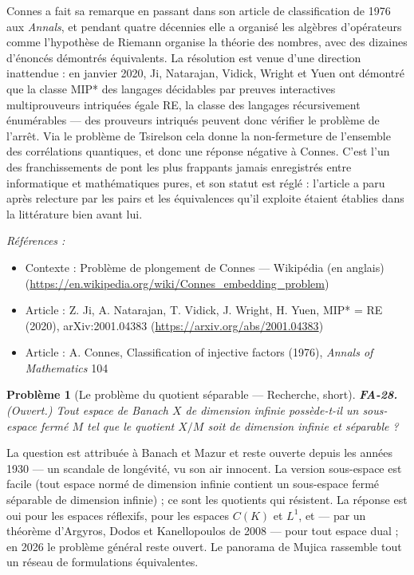 \documentclass[11pt]{article}
\newtheorem{problem}{Problème}
\newenvironment{refs}{\par\small\noindent\emph{Références :}\begin{itemize}\setlength\itemsep{0pt}}{\end{itemize}\normalsize}
\begin{document}
\noindent Connes a fait sa remarque en passant dans son article de classification de 1976 aux
\textit{Annals}, et pendant quatre décennies elle a organisé les algèbres d'opérateurs comme l'hypothèse de
Riemann organise la théorie des nombres, avec des dizaines d'énoncés démontrés équivalents. La résolution
est venue d'une direction inattendue : en janvier 2020, Ji, Natarajan, Vidick, Wright et Yuen ont démontré
que la classe MIP* des langages décidables par preuves interactives multiprouveurs intriquées égale RE, la
classe des langages récursivement énumérables --- des prouveurs intriqués peuvent donc vérifier le problème
de l'arrêt. Via le problème de Tsirelson cela donne la non-fermeture de l'ensemble des corrélations
quantiques, et donc une réponse négative à Connes. C'est l'un des franchissements de pont les plus
frappants jamais enregistrés entre informatique et mathématiques pures, et son statut est réglé : l'article
a paru après relecture par les pairs et les équivalences qu'il exploite étaient établies dans la
littérature bien avant lui.

\begin{refs}
\item Contexte : Problème de plongement de Connes --- Wikipédia (en anglais) (\url{https://en.wikipedia.org/wiki/Connes_embedding_problem})
\item Article : Z. Ji, A. Natarajan, T. Vidick, J. Wright, H. Yuen, \og{} MIP* = RE \fg{} (2020), arXiv:2001.04383 (\url{https://arxiv.org/abs/2001.04383})
\item Article : A. Connes, \og{} Classification of injective factors \fg{} (1976), \textit{Annals of Mathematics} 104
\end{refs}

\bigskip

\begin{problem}[{Le problème du quotient séparable --- Recherche, short}]
\textbf{FA-28.} (Ouvert.) Tout espace de Banach $ X $ de dimension infinie
possède-t-il un sous-espace fermé $ M $ tel que le quotient $ X/M $ soit de dimension infinie et
séparable ?
\end{problem}

\noindent La question est attribuée à Banach et Mazur et reste ouverte depuis les années 1930 ---
un scandale de longévité, vu son air innocent. La version \og{} sous-espace \fg{} est facile (tout espace normé de
dimension infinie contient un sous-espace fermé séparable de dimension infinie) ; ce sont les quotients qui
résistent. La réponse est oui pour les espaces réflexifs, pour les espaces $ C(K) $ et $ L^1 $, et --- par
un théorème d'Argyros, Dodos et Kanellopoulos de 2008 --- pour tout espace dual ; en 2026 le problème général
reste ouvert. Le panorama de Mujica rassemble tout un réseau de formulations équivalentes.
\end{document}
